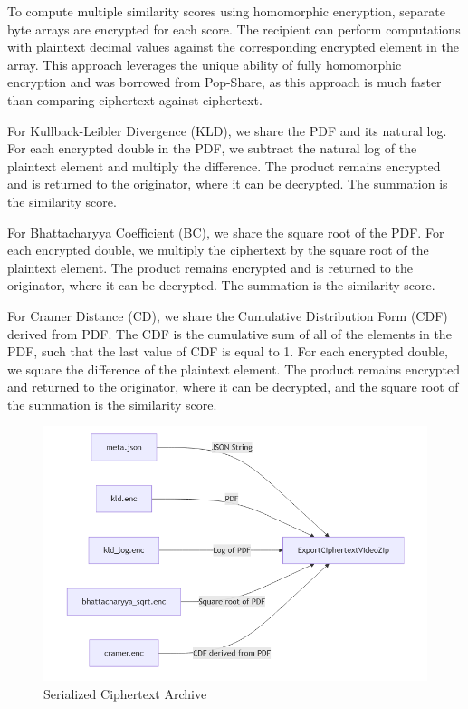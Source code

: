 To compute multiple similarity scores using homomorphic encryption, separate byte arrays are encrypted for each score. The recipient can perform computations with plaintext decimal values against the corresponding encrypted element in the array. This approach leverages the unique ability of fully homomorphic encryption and was borrowed from Pop-Share, as this approach is much faster than comparing ciphertext against ciphertext. 

For Kullback-Leibler Divergence (KLD), we share the PDF and its natural log. For each encrypted double in the PDF, we subtract the natural log of the plaintext element and multiply the difference. The product remains encrypted and is returned to the originator, where it can be decrypted. The summation is the similarity score.

For Bhattacharyya Coefficient (BC), we share the square root of the PDF. For each encrypted double, we multiply the ciphertext by the square root of the plaintext element. The product remains encrypted and is returned to the originator, where it can be decrypted. The summation is the similarity score.

For Cramer Distance (CD), we share the Cumulative Distribution Form (CDF) derived from PDF. The CDF is the cumulative sum of all of the elements in the PDF, such that the last value of CDF is equal to 1. For each encrypted double, we square the difference of the plaintext element. The product remains encrypted and returned to the originator, where it can be decrypted, and the square root of the summation is the similarity score.

\begin{figure}[t]
    \centering
    \includegraphics[width=\textwidth]{4 Design/4.3 Archive.png}
    \caption{Serialized Ciphertext Archive}
    \label{fig:ciphertext-archive-contents}
\end{figure}

